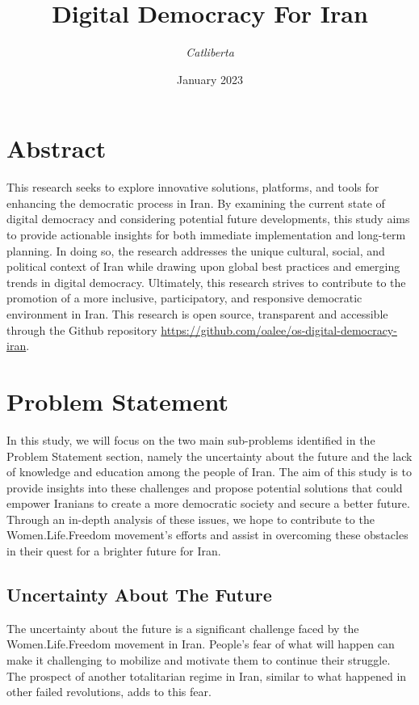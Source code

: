 \documentclass{IEEEtran}
\title{ \Huge \textbf{ Digital Democracy For Iran } \\[0.5cm]}
\author{

\textit{Catliberta} \\
}
\date{January 2023}
\newcommand{\note}[1]{\todo[inline]{#1}}
\begin{document}
\maketitle




\section{Abstract}

This research seeks to explore innovative solutions, platforms, and tools for enhancing the democratic process in Iran. By examining the current state of digital democracy and considering potential future developments, this study aims to provide actionable insights for both immediate implementation and long-term planning. In doing so, the research addresses the unique cultural, social, and political context of Iran while drawing upon global best practices and emerging trends in digital democracy. Ultimately, this research strives to contribute to the promotion of a more inclusive, participatory, and responsive democratic environment in Iran.
This research is open source, transparent and accessible through the Github repository \url{https://github.com/oalee/os-digital-democracy-iran}. 

\section{Problem Statement}

In this study, we will focus on the two main sub-problems identified in the Problem Statement section, namely the uncertainty about the future and the lack of knowledge and education among the people of Iran. The aim of this study is to provide insights into these challenges and propose potential solutions that could empower Iranians to create a more democratic society and secure a better future. Through an in-depth analysis of these issues, we hope to contribute to the Women.Life.Freedom movement's efforts and assist in overcoming these obstacles in their quest for a brighter future for Iran.



\subsection{Uncertainty About The Future}
The uncertainty about the future is a significant challenge faced by the Women.Life.Freedom movement in Iran. 
People's fear of what will happen can make it challenging to mobilize and motivate them to continue their struggle.
The prospect of another totalitarian regime in Iran, similar to what happened in other failed revolutions, adds to this fear.
\end{document}
